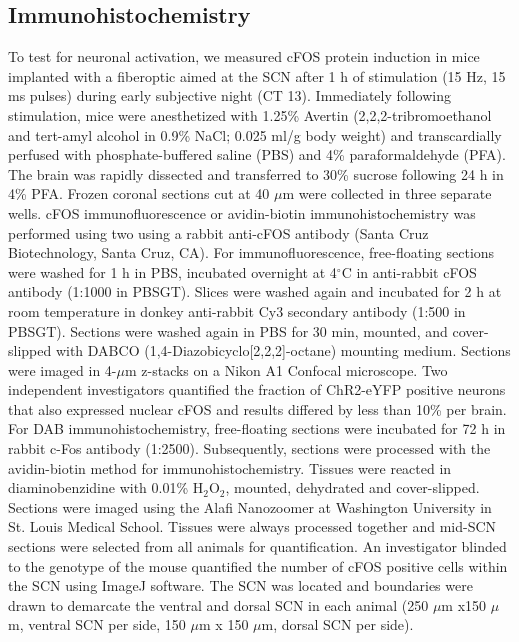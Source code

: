 \subsection*{Immunohistochemistry} 
To test for neuronal activation, we measured cFOS protein induction in mice implanted with a fiberoptic aimed at the SCN after 1 h of stimulation (15 Hz, 15 ms pulses) during early subjective night (CT 13).
Immediately following stimulation, mice were anesthetized with 1.25\% Avertin (2,2,2-tribromoethanol and tert-amyl alcohol in 0.9\% NaCl; 0.025 ml/g body weight) and transcardially perfused with phosphate-buffered saline (PBS) and 4\% paraformaldehyde (PFA).
The brain was rapidly dissected and transferred to 30\% sucrose following 24 h in 4\% PFA.
Frozen coronal sections cut at 40 $\mu$m were collected in three separate wells. 
cFOS immunofluorescence or avidin-biotin immunohistochemistry was performed using two using a rabbit anti-cFOS antibody (Santa Cruz Biotechnology, Santa Cruz, CA).
For immunofluorescence, free-floating sections were washed for 1 h in PBS, incubated overnight at 4$^\circ$C in anti-rabbit cFOS antibody (1:1000 in PBSGT).
Slices were washed again and incubated for 2 h at room temperature in donkey anti-rabbit Cy3 secondary antibody (1:500 in PBSGT).
Sections were washed again in PBS for 30 min, mounted, and cover-slipped with DABCO (1,4-Diazobicyclo[2,2,2]-octane) mounting medium.
Sections were imaged in 4-$\mu$m z-stacks on a Nikon A1 Confocal microscope.
Two independent investigators quantified the fraction of ChR2-eYFP positive neurons that also expressed nuclear cFOS and results differed by less than 10\% per brain.
For DAB immunohistochemistry, free-floating sections were incubated for 72 h in rabbit c-Fos antibody (1:2500).
Subsequently, sections were processed with the avidin-biotin method for immunohistochemistry.
Tissues were reacted in diaminobenzidine with 0.01\% H$_2$O$_2$, mounted, dehydrated and cover-slipped.
Sections were imaged using the Alafi Nanozoomer at Washington University in St. Louis Medical School.
Tissues were always processed together and mid-SCN sections were selected from all animals for quantification.
An investigator blinded to the genotype of the mouse quantified the number of cFOS positive cells within the SCN using ImageJ software.
The SCN was located and boundaries were drawn to demarcate the ventral and dorsal SCN in each animal (250 $\mu$m x150 $\mu$m, ventral SCN per side, 150 $\mu$m x 150 $\mu$m, dorsal SCN per side).

